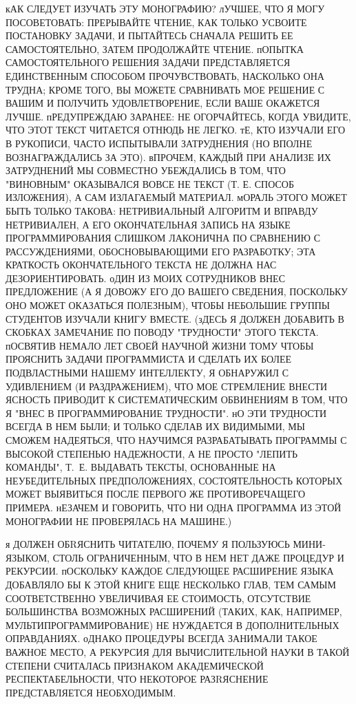 \bigskip
кАК СЛЕДУЕТ ИЗУЧАТЬ ЭТУ МОНОГРАФИЮ? лУЧШЕЕ, ЧТО Я МОГУ ПОСОВЕТОВАТЬ: 
ПРЕРЫВАЙТЕ ЧТЕНИЕ, КАК ТОЛЬКО УСВОИТЕ ПОСТАНОВКУ ЗАДАЧИ, И ПЫТАЙТЕСЬ СНАЧАЛА
РЕШИТЬ ЕЕ САМОСТОЯТЕЛЬНО, ЗАТЕМ ПРОДОЛЖАЙТЕ ЧТЕНИЕ. пОПЫТКА САМОСТОЯТЕЛЬНОГО 
РЕШЕНИЯ ЗАДАЧИ ПРЕДСТАВЛЯЕТСЯ ЕДИНСТВЕННЫМ СПОСОБОМ ПРОЧУВСТВОВАТЬ, НАСКОЛЬКО 
ОНА ТРУДНА; КРОМЕ ТОГО, ВЫ МОЖЕТЕ СРАВНИВАТЬ МОЕ РЕШЕНИЕ С ВАШИМ И ПОЛУЧИТЬ 
УДОВЛЕТВОРЕНИЕ, ЕСЛИ ВАШЕ ОКАЖЕТСЯ ЛУЧШЕ. пРЕДУПРЕЖДАЮ ЗАРАНЕЕ: НЕ ОГОРЧАЙТЕСЬ, 
КОГДА УВИДИТЕ, ЧТО ЭТОТ ТЕКСТ ЧИТАЕТСЯ ОТНЮДЬ НЕ ЛЕГКО. тЕ, КТО ИЗУЧАЛИ ЕГО 
В РУКОПИСИ, ЧАСТО ИСПЫТЫВАЛИ ЗАТРУДНЕНИЯ (НО ВПОЛНЕ ВОЗНАГРАЖДАЛИСЬ ЗА ЭТО).
вПРОЧЕМ, КАЖДЫЙ ПРИ АНАЛИЗЕ ИХ ЗАТРУДНЕНИЙ МЫ СОВМЕСТНО УБЕЖДАЛИСЬ В ТОМ, 
ЧТО "ВИНОВНЫМ" ОКАЗЫВАЛСЯ ВОВСЕ НЕ ТЕКСТ (Т. Е. СПОСОБ ИЗЛОЖЕНИЯ), А САМ 
ИЗЛАГАЕМЫЙ МАТЕРИАЛ. мОРАЛЬ ЭТОГО МОЖЕТ БЫТЬ ТОЛЬКО ТАКОВА: НЕТРИВИАЛЬНЫЙ
АЛГОРИТМ И ВПРАВДУ НЕТРИВИАЛЕН, А ЕГО ОКОНЧАТЕЛЬНАЯ ЗАПИСЬ НА ЯЗЫКЕ 
ПРОГРАММИРОВАНИЯ СЛИШКОМ ЛАКОНИЧНА ПО СРАВНЕНИЮ С РАССУЖДЕНИЯМИ,
ОБОСНОВЫВАЮЩИМИ ЕГО РАЗРАБОТКУ; ЭТА КРАТКОСТЬ ОКОНЧАТЕЛЬНОГО ТЕКСТА НЕ 
ДОЛЖНА НАС ДЕЗОРИЕНТИРОВАТЬ. оДИН ИЗ МОИХ  СОТРУДНИКОВ ВНЕС ПРЕДЛОЖЕНИЕ 
(А Я ДОВОЖУ ЕГО ДО ВАШЕГО СВЕДЕНИЯ, ПОСКОЛЬКУ ОНО МОЖЕТ ОКАЗАТЬСЯ ПОЛЕЗНЫМ), 
ЧТОБЫ НЕБОЛЬШИЕ ГРУППЫ СТУДЕНТОВ ИЗУЧАЛИ КНИГУ ВМЕСТЕ. (зДЕСЬ Я ДОЛЖЕН ДОБАВИТЬ 
В СКОБКАХ ЗАМЕЧАНИЕ ПО ПОВОДУ "ТРУДНОСТИ" ЭТОГО ТЕКСТА. пОСВЯТИВ НЕМАЛО ЛЕТ 
СВОЕЙ НАУЧНОЙ ЖИЗНИ ТОМУ ЧТОБЫ ПРОЯСНИТЬ ЗАДАЧИ ПРОГРАММИСТА И СДЕЛАТЬ ИХ 
БОЛЕЕ ПОДВЛАСТНЫМИ НАШЕМУ ИНТЕЛЛЕКТУ, Я ОБНАРУЖИЛ С УДИВЛЕНИЕМ (И РАЗДРАЖЕНИЕМ), 
ЧТО МОЕ СТРЕМЛЕНИЕ ВНЕСТИ ЯСНОСТЬ ПРИВОДИТ К СИСТЕМАТИЧЕСКИМ ОБВИНЕНИЯМ В ТОМ, 
ЧТО Я "ВНЕС В ПРОГРАММИРОВАНИЕ ТРУДНОСТИ". нО ЭТИ ТРУДНОСТИ ВСЕГДА В НЕМ БЫЛИ; 
И ТОЛЬКО СДЕЛАВ ИХ ВИДИМЫМИ, МЫ СМОЖЕМ НАДЕЯТЬСЯ, ЧТО НАУЧИМСЯ РАЗРАБАТЫВАТЬ 
ПРОГРАММЫ С ВЫСОКОЙ СТЕПЕНЬЮ НАДЕЖНОСТИ, А НЕ ПРОСТО "ЛЕПИТЬ КОМАНДЫ", 
Т.~Е. ВЫДАВАТЬ ТЕКСТЫ, ОСНОВАННЫЕ НА НЕУБЕДИТЕЛЬНЫХ ПРЕДПОЛОЖЕНИЯХ, 
СОСТОЯТЕЛЬНОСТЬ КОТОРЫХ МОЖЕТ ВЫЯВИТЬСЯ ПОСЛЕ ПЕРВОГО ЖЕ ПРОТИВОРЕЧАЩЕГО 
ПРИМЕРА. нЕЗАЧЕМ И ГОВОРИТЬ, ЧТО НИ ОДНА ПРОГРАММА ИЗ ЭТОЙ МОНОГРАФИИ НЕ
ПРОВЕРЯЛАСЬ НА МАШИНЕ.)

я ДОЛЖЕН ОБRЯСНИТЬ ЧИТАТЕЛЮ, ПОЧЕМУ Я ПОЛЬЗУЮСЬ МИНИ-ЯЗЫКОМ, СТОЛЬ 
ОГРАНИЧЕННЫМ, ЧТО В НЕМ НЕТ ДАЖЕ ПРОЦЕДУР И РЕКУРСИИ. пОСКОЛЬКУ КАЖДОЕ
СЛЕДУЮЩЕЕ РАСШИРЕНИЕ ЯЗЫКА ДОБАВЛЯЛО БЫ К ЭТОЙ КНИГЕ ЕЩЕ НЕСКОЛЬКО ГЛАВ, 
ТЕМ САМЫМ СООТВЕТСТВЕННО УВЕЛИЧИВАЯ ЕЕ СТОИМОСТЬ, ОТСУТСТВИЕ БОЛЬШИНСТВА
ВОЗМОЖНЫХ РАСШИРЕНИЙ (ТАКИХ, КАК, НАПРИМЕР, МУЛЬТИПРОГРАММИРОВАНИЕ) НЕ 
НУЖДАЕТСЯ В ДОПОЛНИТЕЛЬНЫХ ОПРАВДАНИЯХ.  оДНАКО  ПРОЦЕДУРЫ ВСЕГДА ЗАНИМАЛИ 
ТАКОЕ ВАЖНОЕ МЕСТО, А РЕКУРСИЯ ДЛЯ ВЫЧИСЛИТЕЛЬНОЙ НАУКИ В ТАКОЙ СТЕПЕНИ 
СЧИТАЛАСЬ ПРИЗНАКОМ  АКАДЕМИЧЕСКОЙ РЕСПЕКТАБЕЛЬНОСТИ, ЧТО НЕКОТОРОЕ 
РАЗRЯСНЕНИЕ ПРЕДСТАВЛЯЕТСЯ НЕОБХОДИМЫМ.

